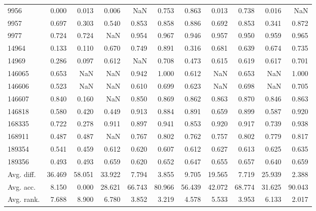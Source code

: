 \begin{tabular}{lrrrrrrrrrr}
9956 & 0.000 & 0.013 & 0.006 & NaN & 0.753 & 0.863 & 0.013 & 0.738 & 0.016 & NaN \\
9957 & 0.697 & 0.303 & 0.540 & 0.853 & 0.858 & 0.886 & 0.692 & 0.853 & 0.341 & 0.872 \\
9977 & 0.724 & 0.724 & NaN & 0.954 & 0.967 & 0.946 & 0.957 & 0.950 & 0.959 & 0.965 \\
14964 & 0.133 & 0.110 & 0.670 & 0.749 & 0.891 & 0.316 & 0.681 & 0.639 & 0.674 & 0.735 \\
14969 & 0.286 & 0.097 & 0.612 & NaN & 0.708 & 0.473 & 0.615 & 0.619 & 0.617 & 0.701 \\
146065 & 0.653 & NaN & NaN & 0.942 & 1.000 & 0.612 & NaN & 0.653 & NaN & 1.000 \\
146606 & 0.523 & NaN & NaN & 0.610 & 0.699 & 0.623 & NaN & 0.698 & NaN & 0.705 \\
146607 & 0.840 & 0.160 & NaN & 0.850 & 0.869 & 0.862 & 0.863 & 0.870 & 0.846 & 0.863 \\
146818 & 0.580 & 0.420 & 0.449 & 0.913 & 0.884 & 0.891 & 0.659 & 0.899 & 0.587 & 0.920 \\
168335 & 0.722 & 0.278 & 0.911 & 0.897 & 0.941 & 0.853 & 0.920 & 0.917 & 0.739 & 0.938 \\
168911 & 0.487 & 0.487 & NaN & 0.767 & 0.802 & 0.762 & 0.757 & 0.802 & 0.779 & 0.817 \\
189354 & 0.541 & 0.459 & 0.612 & 0.620 & 0.607 & 0.612 & 0.627 & 0.613 & 0.625 & 0.635 \\
189356 & 0.493 & 0.493 & 0.659 & 0.620 & 0.652 & 0.647 & 0.655 & 0.657 & 0.640 & 0.659 \\
Avg. diff. & 36.469 & 58.051 & 33.922 & 7.794 & 3.855 & 9.705 & 19.565 & 7.719 & 25.939 & 2.388 \\
Avg. acc. & 8.150 & 0.000 & 28.621 & 66.743 & 80.966 & 56.439 & 42.072 & 68.774 & 31.625 & 90.043 \\
Avg. rank. & 7.688 & 8.900 & 6.780 & 3.852 & 3.219 & 4.578 & 5.533 & 3.953 & 6.133 & 2.017 \\
\bottomrule
\end{tabular}
